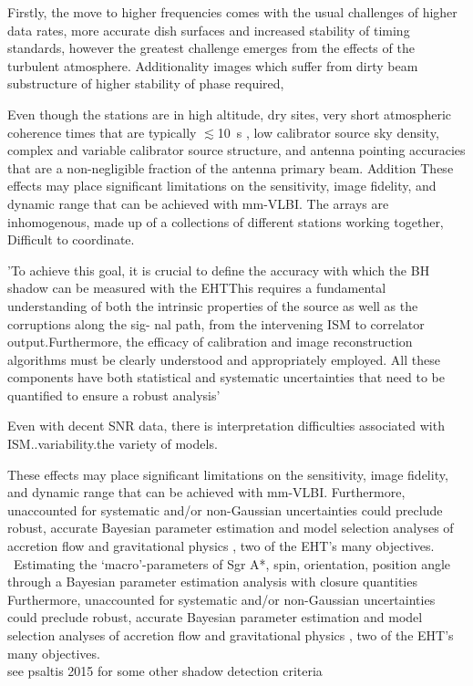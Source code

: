 Firstly, the move to higher frequencies comes with the usual challenges of higher data rates, more accurate dish surfaces and increased stability of timing standards, however the greatest challenge emerges from the effects of the turbulent atmosphere. Additionality images which suffer from dirty beam substructure of higher stability of phase required,



Even though the stations are in high altitude, dry sites, very short atmospheric coherence times that are typically $\lesssim$10~s \citep{Doeleman_2009}, low calibrator source sky density, complex and variable calibrator source structure, and antenna pointing accuracies that are a non-negligible fraction of the antenna primary beam. Addition These effects may place significant limitations on the sensitivity, image fidelity, and dynamic range that can be achieved with mm-VLBI. The arrays are inhomogenous, made up of a collections of different stations working together, Difficult to coordinate.

'To achieve this goal, it is crucial to define the accuracy with which the BH
shadow can be measured with the EHTThis requires a fundamental understanding
of both the intrinsic properties of the source as well as the corruptions along the sig-
nal path, from the intervening ISM to correlator output.Furthermore, the efficacy
of calibration and image reconstruction algorithms must be clearly understood and
appropriately employed. All these components have both statistical and systematic
uncertainties that need to be quantified to ensure a robust analysis'


Even with decent SNR data, there is interpretation difficulties associated with ISM..variability.the variety of models.



These effects may place significant limitations on the sensitivity, image fidelity, and dynamic range that can be achieved with mm-VLBI.  Furthermore, unaccounted for systematic and/or non-Gaussian uncertainties could preclude robust, accurate Bayesian parameter estimation and model selection analyses of accretion flow \citep[e.g.][]{Broderick_2016} and gravitational physics \citep[e.g.][]{Broderick_2014, Psaltis_2016}, two of the EHT's many objectives. 
~Estimating the `macro'-parameters of Sgr A*, spin, orientation, position angle through a Bayesian parameter estimation analysis with closure quantities\\
Furthermore, unaccounted for systematic and/or non-Gaussian uncertainties could preclude robust, accurate Bayesian parameter estimation and model selection analyses of accretion flow \citep[e.g.][]{Broderick_2016} and gravitational physics \citep[e.g.][]{Broderick_2014, Psaltis_2016}, two of the EHT's many objectives.
~\\
see psaltis 2015 for  some other shadow detection criteria


